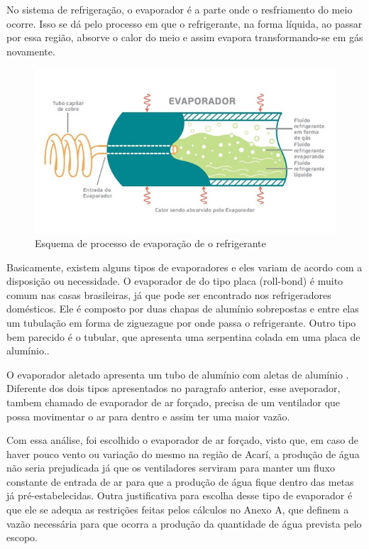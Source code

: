 No sistema de refrigeração, o evaporador é a parte onde o resfriamento do meio ocorre. Isso se dá pelo processo em que o refrigerante, na forma líquida, ao passar por essa região, absorve o calor do meio e assim evapora transformando-se em gás novamente. 
\begin{figure}[!htbp]
	 \centering
	  \includegraphics[scale=1]{editaveis/figuras/evaporador}
	  \caption[Esquema de processo de evaporação de o refrigerante]{Esquema de processo de evaporação de o refrigerante\footnotemark}
	  \label{condensador}
	\end{figure}	   
	\FloatBarrier
	
	
Basicamente, existem alguns tipos de evaporadores e eles variam de acordo com a disposição ou necessidade. O evaporador de do tipo placa (roll-bond) é muito comum nas casas brasileiras, já que pode ser encontrado nos refrigeradores domésticos. Ele é composto por duas chapas de alumínio sobrepostas e entre elas um tubulação em forma de ziguezague por onde passa o refrigerante. Outro tipo bem parecido é o tubular, que apresenta uma serpentina colada em uma placa de alumínio.\cite{embracocolecao}.

O evaporador aletado apresenta um tubo de alumínio com aletas de alumínio \cite{embracocolecao}. Diferente dos dois tipos apresentados no paragrafo anterior, esse aveporador, tambem chamado de evaporador de ar forçado, precisa de um ventilador que possa movimentar o ar para dentro e assim ter uma maior vazão. 

Com essa análise, foi escolhido o evaporador de ar forçado, visto que, em caso de haver pouco vento ou variação do mesmo na região de Acarí, a produção de água não seria prejudicada já que os ventiladores serviram para manter um fluxo constante de entrada de ar para que a produção de água fique dentro das metas já pré-estabelecidas. 
Outra justificativa para escolha desse tipo de evaporador é que ele se adequa as restrições feitas pelos cálculos no Anexo A, que definem a vazão necessária para que ocorra a produção da quantidade de água prevista pelo escopo.

